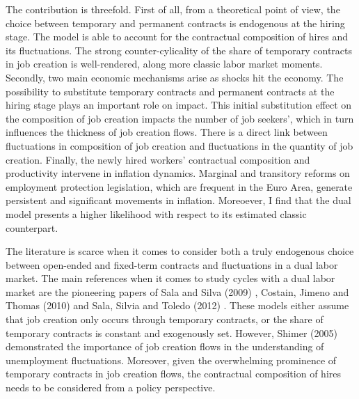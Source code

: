 \documentclass[a4paper]{article}
\begin{document}
The contribution is threefold. First of all, from a theoretical point of view, the choice between temporary and permanent contracts is endogenous at the hiring stage. The model is able to account for the contractual composition of hires and its fluctuations. The strong counter-cylicality of the share of temporary contracts in job creation is well-rendered, along more classic labor market moments. Secondly, two main economic mechanisms arise as shocks hit the economy. The possibility to substitute temporary contracts and permanent contracts at the hiring stage plays an important role on impact. This initial substitution effect on the composition of job creation impacts the number of job seekers', which in turn influences the thickness of job creation flows. There is a direct link between fluctuations in composition of job creation and fluctuations in the quantity of job creation. Finally, the newly hired workers' contractual composition and productivity intervene in inflation dynamics. Marginal and transitory reforms on employment protection legislation, which are frequent in the Euro Area, generate persistent and significant movements in inflation. Moreoever, I find that the dual model presents a higher likelihood with respect to its estimated classic counterpart.

The literature is scarce when it comes to consider both a truly endogenous choice between open-ended and fixed-term contracts and fluctuations in a dual labor market. The main references when it comes to study cycles with a dual labor market are the pioneering papers of Sala and Silva (2009) \cite{sala2009flexibility}, Costain, Jimeno and Thomas (2010) \cite{costain2010employment} and Sala, Silvia and Toledo (2012) \cite{SJOE:SJOE1715}. These models either assume that job creation only occurs through temporary contracts, or the share of temporary contracts is constant and exogenously set. 
However, Shimer (2005) \cite{shimer2005cyclical} demonstrated the importance of job creation flows in the understanding of unemployment fluctuations. Moreover, given the overwhelming prominence of temporary contracts in job creation flows, the contractual composition of hires needs to be considered from a policy perspective.
\end{document}
